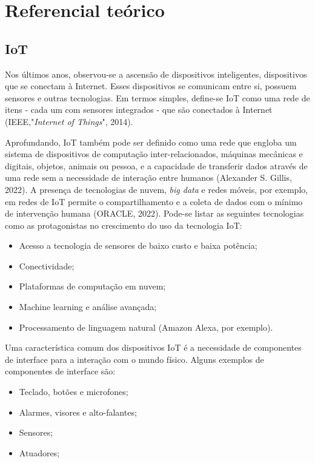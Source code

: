 \chapter{Referencial teórico}\label{chapter:referencial_teorico}

\section{IoT}

Nos últimos anos, observou-se a ascensão de dispositivos inteligentes, dispositivos que se conectam à Internet. Esses dispositivos se comunicam entre si, possuem sensores e outras tecnologias. Em termos simples, define-se IoT como uma rede de itens - cada um com sensores integrados - que são conectados à Internet (IEEE,"\textit{Internet of Things}", 2014).

Aprofundando, IoT também pode ser definido como uma rede que engloba um sistema de dispositivos de computação inter-relacionados, máquinas mecânicas e digitais, objetos, animais ou pessoa, e a capacidade de transferir dados através de uma rede sem a necessidade de interação entre humanos (Alexander S. Gillis, 2022). A presença de tecnologias de nuvem, \textit{big data} e redes móveis, por exemplo, em redes de IoT permite o compartilhamento e a coleta de dados com o mínimo de intervenção humana (ORACLE, 2022). Pode-se listar as seguintes tecnologias como as protagonistas no crescimento do uso da tecnologia IoT:

\begin{itemize}
	\item Acesso a tecnologia de sensores de baixo custo e baixa potência;
	\item Conectividade;
	\item Plataformas de computação em nuvem;
	\item Machine learning e análise avançada;
	\item Processamento de linguagem natural (Amazon Alexa, por exemplo).
\end{itemize}

Uma característica comum dos dispositivos IoT é a necessidade de componentes de interface para a interação com o mundo físico. Alguns exemplos de componentes de interface são:

\begin{itemize}
	\item Teclado, botões e microfones;
	\item Alarmes, visores e alto-falantes;
	\item Sensores;
	\item Atuadores;
\end{itemize}

